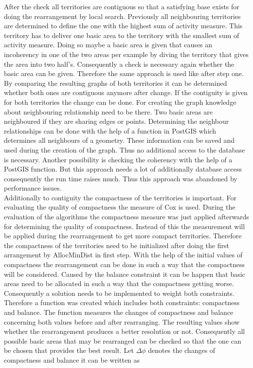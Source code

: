 After the check all territories are contiguous so that a satisfying base exists for doing the rearrangement by local search. Previously all neighbouring territories are determined to define the one with the highest sum of activity measure. This territory has to deliver one basic area to the territory with the smallest sum of activity measure. Doing so maybe a basic area is given that causes an incoherency in one of the two areas per example by diving the territory that gives the area into two half's. Consequently a check is necessary again whether the basic area can be given. Therefore the same approach is used like after step one. By comparing the resulting graphs of both territories it can be determined whether both ones are contiguous anymore after change. If the contiguity is given for both territories the change can be done. For creating the graph knowledge about neighbouring relationship need to be there. Two basic areas are neighboured if they are sharing edges or points. Determining the neighbour relationships can be done with the help of a function in PostGIS which determines all neighbours of a geometry. These information can be saved and used during the creation of the graph. Thus no additional access to the database is necessary. Another possibility is checking the coherency with the help of a PostGIS function. But this approach needs a lot of additionally database access consequently the run time raises much. Thus this approach was abandoned by performance issues. \\
Additionally to contiguity the compactness of the territories is important. For evaluating the quality of compactness the measure of Cox is used. During the evaluation of the algorithms the compactness measure was just applied afterwards for determining the quality of compactness. Instead of this the measurement will be applied during the rearrangement to get more compact territories. Therefore the compactness of the territories need to be initialized after doing the first arrangement by AllocMinDist in first step. With the help of the initial values of compactness the rearrangement can be done in such a way that the compactness will be considered. Caused by the balance constraint it can be happen that basic areas need to be allocated in such a way that the compactness getting worse. Consequently a solution needs to be implemented to weight both constraints. Therefore a function was created which includes both constraints: compactness and balance. The function measures the changes of compactness and balance concerning both values before and after rearranging. The resulting values show whether the rearrangement produces a better resolution or not. Consequently all possible basic areas that may be rearranged can be checked so that the one can be chosen that provides the best result. Let $\Delta \phi $ denotes the changes of compactness and balance it can be written as

